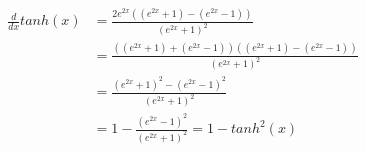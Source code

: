 \documentclass[12pt]{article}
\begin{document}
\begin{equation}
 \begin{align}
  \frac{d}{dx} tanh(x) &= \frac{2 e^{2x} \left( (e^{2x} + 1) - (e^{2x} - 1) \right)}{(e^{2x} + 1)^2} \\
  &= \frac{\left( (e^{2x} + 1) + (e^{2x} - 1) \right) \left( (e^{2x} + 1) - (e^{2x} - 1) \right)}{(e^{2x} + 1)^2} \\
  &=  \frac{(e^{2x} + 1)^2 - (e^{2x} - 1)^2}{(e^{2x} + 1)^2} \\
  &= 1 - \frac{(e^{2x} - 1)^2}{(e^{2x} + 1)^2} = 1 - tanh^2(x)
 \end{align}
\end{equation}
\end{document}
